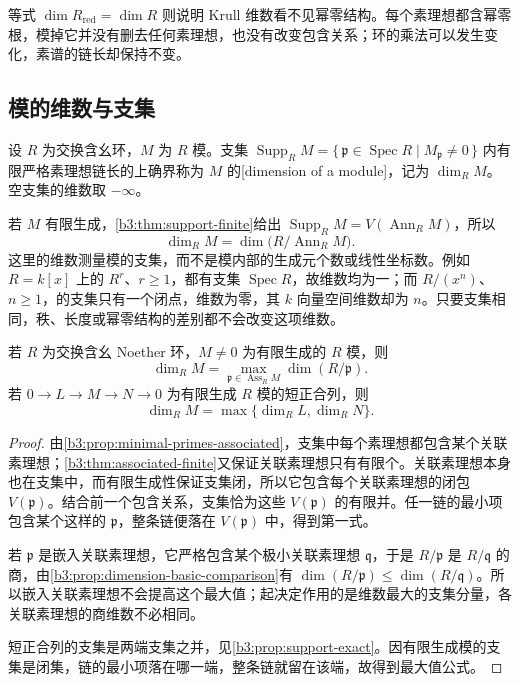 \ProseParagraphBreak
等式 \(\dim R_{\mathrm{red}}=\dim R\) 则说明 Krull 维数看不见幂零结构。每个素理想都含幂零根，模掉它并没有删去任何素理想，也没有改变包含关系；环的乘法可以发生变化，素谱的链长却保持不变。

\subsection{模的维数与支集}
\label{b3:subsec:0901:02}

\begin{definition}\label{b3:def:module-dimension}
	设 \(R\) 为交换含幺环，\(M\) 为 \(R\) 模。支集 \(\operatorname{Supp}_R M=\{\,\mathfrak p\in\operatorname{Spec}R\mid M_{\mathfrak p}\ne0\,\}\) 内有限严格素理想链长的上确界称为 \(M\) 的[dimension of a module]，记为 \(\dim_R M\)。空支集的维数取 \(-\infty\)。
\end{definition}

若 \(M\) 有限生成，\cref{b3:thm:support-finite}给出 \(\operatorname{Supp}_R M=V(\operatorname{Ann}_R M)\)，所以
\begin{equation}\label{b3:eq:module-dimension-annihilator}
	\dim_R M=\dim\bigl(R/\operatorname{Ann}_R M\bigr).
\end{equation}
这里的维数测量模的支集，而不是模内部的生成元个数或线性坐标数。例如 \(R=k[x]\) 上的 \(R^r\)、\(r\ge1\)，都有支集 \(\operatorname{Spec}R\)，故维数均为一；而 \(R/(x^n)\)、\(n\ge1\)，的支集只有一个闭点，维数为零，其 \(k\) 向量空间维数却为 \(n\)。只要支集相同，秩、长度或幂零结构的差别都不会改变这项维数。

\begin{proposition}\label{b3:prop:dimension-associated-components}
	若 \(R\) 为交换含幺 Noether 环，\(M\ne0\) 为有限生成的 \(R\) 模，则
	\[
		\dim_R M=\max_{\mathfrak p\in\operatorname{Ass}_R M}\dim(R/\mathfrak p).
	\]
	若 \(0\rightarrow L\rightarrow M\rightarrow N\rightarrow0\) 为有限生成 \(R\) 模的短正合列，则
	\[
		\dim_R M=\max\{\dim_R L,\dim_R N\}.
	\]
\end{proposition}
\begin{proof}
	由\cref{b3:prop:minimal-primes-associated}，支集中每个素理想都包含某个关联素理想；\cref{b3:thm:associated-finite}又保证关联素理想只有有限个。关联素理想本身也在支集中，而有限生成性保证支集闭，所以它包含每个关联素理想的闭包 \(V(\mathfrak p)\)。结合前一个包含关系，支集恰为这些 \(V(\mathfrak p)\) 的有限并。任一链的最小项包含某个这样的 \(\mathfrak p\)，整条链便落在 \(V(\mathfrak p)\) 中，得到第一式。

	若 \(\mathfrak p\) 是嵌入关联素理想，它严格包含某个极小关联素理想 \(\mathfrak q\)，于是 \(R/\mathfrak p\) 是 \(R/\mathfrak q\) 的商，由\cref{b3:prop:dimension-basic-comparison}有 \(\dim(R/\mathfrak p)\le\dim(R/\mathfrak q)\)。所以嵌入关联素理想不会提高这个最大值；起决定作用的是维数最大的支集分量，各关联素理想的商维数不必相同。

	短正合列的支集是两端支集之并，见\cref{b3:prop:support-exact}。因有限生成模的支集是闭集，链的最小项落在哪一端，整条链就留在该端，故得到最大值公式。
\end{proof}

